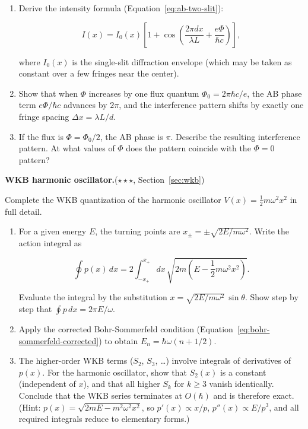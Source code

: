 \begin{problemset}
\begin{enumerate}
\item[(b)] Derive the intensity formula (Equation~\eqref{eq:ab-two-slit}):
\begin{linenomath}
\begin{equation}
I(x) = I_0(x)\left[1 + \cos\left(\frac{2\pi d x}{\lambda L} + \frac{e\Phi}{\hbar c}\right)\right],
\end{equation}
\end{linenomath}
where $I_0(x)$ is the single-slit diffraction envelope (which may be taken as constant over a few fringes near the center).

\item[(c)] Show that when $\Phi$ increases by one flux quantum $\Phi_0 = 2\pi\hbar c/e$, the AB phase term $e\Phi/\hbar c$ advances by $2\pi$, and the interference pattern shifts by exactly one fringe spacing $\Delta x = \lambda L/d$.

\item[(d)] If the flux is $\Phi = \Phi_0/2$, the AB phase is $\pi$. Describe the resulting interference pattern. At what values of $\Phi$ does the pattern coincide with the $\Phi = 0$ pattern?
\end{enumerate}

\item[8.] \textbf{WKB harmonic oscillator.}\quad($\star\star\star$, Section~\ref{sec:wkb})

Complete the WKB quantization of the harmonic oscillator $V(x) = \frac{1}{2}m\omega^2 x^2$ in full detail.

\begin{enumerate}
\item[(a)] For a given energy $E$, the turning points are $x_\pm = \pm\sqrt{2E/m\omega^2}$. Write the action integral as
\begin{linenomath}
\begin{equation}
\oint p(x)\,dx = 2\int_{-x_+}^{x_+} dx\,\sqrt{2m\left(E - \frac{1}{2}m\omega^2 x^2\right)}.
\end{equation}
\end{linenomath}
Evaluate the integral by the substitution $x = \sqrt{2E/m\omega^2}\,\sin\theta$. Show step by step that $\oint p\,dx = 2\pi E/\omega$.

\item[(b)] Apply the corrected Bohr-Sommerfeld condition (Equation~\eqref{eq:bohr-sommerfeld-corrected}) to obtain $E_n = \hbar\omega(n+1/2)$.

\item[(c)] The higher-order WKB terms ($S_2$, $S_3$, \ldots) involve integrals of derivatives of $p(x)$. For the harmonic oscillator, show that $S_2(x)$ is a constant (independent of $x$), and that all higher $S_k$ for $k \ge 3$ vanish identically. Conclude that the WKB series terminates at $O(\hbar)$ and is therefore exact. (Hint: $p(x) = \sqrt{2mE - m^2\omega^2 x^2}$, so $p'(x) \propto x/p$, $p''(x) \propto E/p^3$, and all required integrals reduce to elementary forms.)


\end{enumerate}
\end{problemset}
